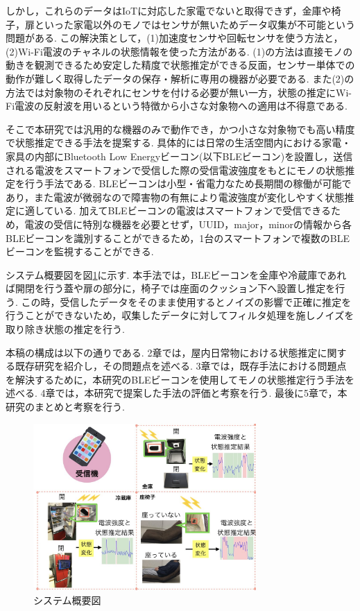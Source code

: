 \documentclass[Japanese]{dicomopapers}
\begin{document}
しかし，これらのデータはIoTに対応した家電でないと取得できず，金庫や椅子，扉といった家電以外のモノではセンサが無いためデータ収集が不可能という問題がある.
この解決策として，(1)加速度センサや回転センサを使う方法と，(2)Wi-Fi電波のチャネルの状態情報を使った方法がある.
(1)の方法は直接モノの動きを観測できるため安定した精度で状態推定ができる反面，センサー単体での動作が難しく取得したデータの保存・解析に専用の機器が必要である. %
また(2)の方法では対象物のそれぞれにセンサを付ける必要が無い一方，状態の推定にWi-Fi電波の反射波を用いるという特徴から小さな対象物への適用は不得意である.

そこで本研究では汎用的な機器のみで動作でき，かつ小さな対象物でも高い精度で状態推定できる手法を提案する.
具体的には日常の生活空間内における家電・家具の内部にBluetooth Low Energyビーコン(以下BLEビーコン)を設置し，送信される電波をスマートフォンで受信した際の受信電波強度をもとにモノの状態推定を行う手法である.
BLEビーコンは小型・省電力なため長期間の稼働が可能であり，また電波が微弱なので障害物の有無により電波強度が変化しやすく状態推定に適している.
加えてBLEビーコンの電波はスマートフォンで受信できるため，電波の受信に特別な機器を必要とせず，UUID，major，minorの情報から各BLEビーコンを識別することができるため，1台のスマートフォンで複数のBLEビーコンを監視することができる.

システム概要図を図\ref{abst}に示す.
本手法では，BLEビーコンを金庫や冷蔵庫であれば開閉を行う蓋や扉の部分に，椅子では座面のクッション下へ設置し推定を行う.
この時，受信したデータをそのまま使用するとノイズの影響で正確に推定を行うことができないため，収集したデータに対してフィルタ処理を施しノイズを取り除き状態の推定を行う.

本稿の構成は以下の通りである.
2章では，屋内日常物における状態推定に関する既存研究を紹介し，その問題点を述べる.
3章では，既存手法における問題点を解決するために，本研究のBLEビーコンを使用してモノの状態推定行う手法を述べる.
4章では，本研究で提案した手法の評価と考察を行う.
最後に5章で，本研究のまとめと考察を行う.



\begin{figure}[ht]
 \centering
 \includegraphics[width=8.5cm]{abst.jpeg}
 \caption{システム概要図}
 \label{abst}
\end{figure}
\end{document}
